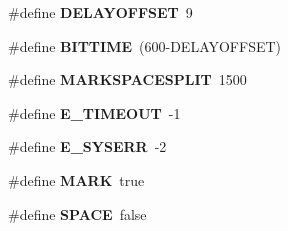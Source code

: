 \begin{DoxyCompactItemize}
\item 
\hypertarget{group___engduino_i_r_gaad3a234ad7aae00ad0d3a610bebb91ea}{}\#define {\bfseries D\+E\+L\+A\+Y\+O\+F\+F\+S\+E\+T}~9\label{group___engduino_i_r_gaad3a234ad7aae00ad0d3a610bebb91ea}

\item 
\hypertarget{group___engduino_i_r_gad8eaec54c72d47f5c161e54ef1928c91}{}\#define {\bfseries B\+I\+T\+T\+I\+M\+E}~(600-\/D\+E\+L\+A\+Y\+O\+F\+F\+S\+E\+T)\label{group___engduino_i_r_gad8eaec54c72d47f5c161e54ef1928c91}

\item 
\hypertarget{group___engduino_i_r_ga774d7e55fd5374068c4f30a947ce37e6}{}\#define {\bfseries M\+A\+R\+K\+S\+P\+A\+C\+E\+S\+P\+L\+I\+T}~1500\label{group___engduino_i_r_ga774d7e55fd5374068c4f30a947ce37e6}

\item 
\hypertarget{group___engduino_i_r_ga1ffb2899b56235563ff47de8478b9864}{}\#define {\bfseries E\+\_\+\+T\+I\+M\+E\+O\+U\+T}~-\/1\label{group___engduino_i_r_ga1ffb2899b56235563ff47de8478b9864}

\item 
\hypertarget{group___engduino_i_r_gac6d8b72b02917be993b64ec0da1ed8fd}{}\#define {\bfseries E\+\_\+\+S\+Y\+S\+E\+R\+R}~-\/2\label{group___engduino_i_r_gac6d8b72b02917be993b64ec0da1ed8fd}

\item 
\hypertarget{group___engduino_i_r_gabeb214368f7f34cff98de9047aa6eb2f}{}\#define {\bfseries M\+A\+R\+K}~true\label{group___engduino_i_r_gabeb214368f7f34cff98de9047aa6eb2f}

\item 
\hypertarget{group___engduino_i_r_ga5ff6e798033f03e74730e99f01936f84}{}\#define {\bfseries S\+P\+A\+C\+E}~false\label{group___engduino_i_r_ga5ff6e798033f03e74730e99f01936f84}

\end{DoxyCompactItemize}
